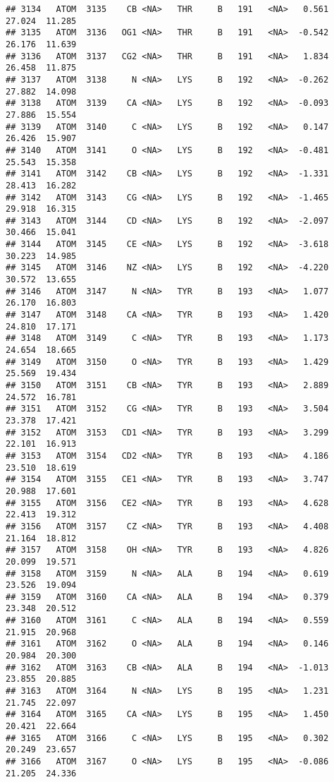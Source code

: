 \documentclass[
]{article}
\begin{document}
\begin{verbatim}
## 3134   ATOM  3135    CB <NA>   THR     B   191   <NA>   0.561  27.024  11.285
## 3135   ATOM  3136   OG1 <NA>   THR     B   191   <NA>  -0.542  26.176  11.639
## 3136   ATOM  3137   CG2 <NA>   THR     B   191   <NA>   1.834  26.458  11.875
## 3137   ATOM  3138     N <NA>   LYS     B   192   <NA>  -0.262  27.882  14.098
## 3138   ATOM  3139    CA <NA>   LYS     B   192   <NA>  -0.093  27.886  15.554
## 3139   ATOM  3140     C <NA>   LYS     B   192   <NA>   0.147  26.426  15.907
## 3140   ATOM  3141     O <NA>   LYS     B   192   <NA>  -0.481  25.543  15.358
## 3141   ATOM  3142    CB <NA>   LYS     B   192   <NA>  -1.331  28.413  16.282
## 3142   ATOM  3143    CG <NA>   LYS     B   192   <NA>  -1.465  29.918  16.315
## 3143   ATOM  3144    CD <NA>   LYS     B   192   <NA>  -2.097  30.466  15.041
## 3144   ATOM  3145    CE <NA>   LYS     B   192   <NA>  -3.618  30.223  14.985
## 3145   ATOM  3146    NZ <NA>   LYS     B   192   <NA>  -4.220  30.572  13.655
## 3146   ATOM  3147     N <NA>   TYR     B   193   <NA>   1.077  26.170  16.803
## 3147   ATOM  3148    CA <NA>   TYR     B   193   <NA>   1.420  24.810  17.171
## 3148   ATOM  3149     C <NA>   TYR     B   193   <NA>   1.173  24.654  18.665
## 3149   ATOM  3150     O <NA>   TYR     B   193   <NA>   1.429  25.569  19.434
## 3150   ATOM  3151    CB <NA>   TYR     B   193   <NA>   2.889  24.572  16.781
## 3151   ATOM  3152    CG <NA>   TYR     B   193   <NA>   3.504  23.378  17.421
## 3152   ATOM  3153   CD1 <NA>   TYR     B   193   <NA>   3.299  22.101  16.913
## 3153   ATOM  3154   CD2 <NA>   TYR     B   193   <NA>   4.186  23.510  18.619
## 3154   ATOM  3155   CE1 <NA>   TYR     B   193   <NA>   3.747  20.988  17.601
## 3155   ATOM  3156   CE2 <NA>   TYR     B   193   <NA>   4.628  22.413  19.312
## 3156   ATOM  3157    CZ <NA>   TYR     B   193   <NA>   4.408  21.164  18.812
## 3157   ATOM  3158    OH <NA>   TYR     B   193   <NA>   4.826  20.099  19.571
## 3158   ATOM  3159     N <NA>   ALA     B   194   <NA>   0.619  23.526  19.094
## 3159   ATOM  3160    CA <NA>   ALA     B   194   <NA>   0.379  23.348  20.512
## 3160   ATOM  3161     C <NA>   ALA     B   194   <NA>   0.559  21.915  20.968
## 3161   ATOM  3162     O <NA>   ALA     B   194   <NA>   0.146  20.984  20.300
## 3162   ATOM  3163    CB <NA>   ALA     B   194   <NA>  -1.013  23.855  20.885
## 3163   ATOM  3164     N <NA>   LYS     B   195   <NA>   1.231  21.745  22.097
## 3164   ATOM  3165    CA <NA>   LYS     B   195   <NA>   1.450  20.421  22.664
## 3165   ATOM  3166     C <NA>   LYS     B   195   <NA>   0.302  20.249  23.657
## 3166   ATOM  3167     O <NA>   LYS     B   195   <NA>  -0.086  21.205  24.336

\end{verbatim}
\end{document}
